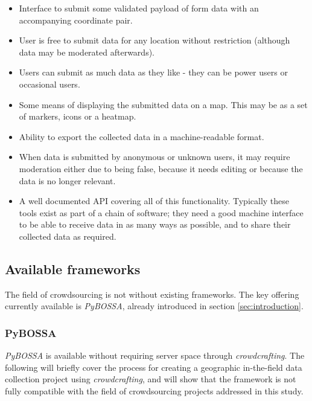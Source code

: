 \documentclass{article}
\begin{document}
		\begin{itemize}
			\item Interface to submit some validated payload of form data with an accompanying coordinate pair.
			\item User is free to submit data for any location without restriction (although data may be moderated afterwards).
			\item Users can submit as much data as they like - they can be power users or occasional users.
			\item Some means of displaying the submitted data on a map. This may be as a set of markers, icons or a heatmap.
			\item Ability to export the collected data in a machine-readable format.
			\item When data is submitted by anonymous or unknown users, it may require moderation either due to being false, because it needs editing or because the data is no longer relevant.
			\item A well documented API covering all of this functionality. Typically these tools exist as part of a chain of software; they need a good machine interface to be able to receive data in as many ways as possible, and to share their collected data as required.
		\end{itemize}

		\subsection{Available frameworks}

		The field of crowdsourcing is not without existing frameworks. The key offering currently available is \emph{PyBOSSA}, already introduced in section \ref{sec:introduction}.

		\subsubsection{PyBOSSA}

		\emph{PyBOSSA} is available without requiring server space through \emph{crowdcrafting}. The following will briefly cover the process for creating a geographic in-the-field data collection project using \emph{crowdcrafting}, and will show that the framework is not fully compatible with the field of crowdsourcing projects addressed in this study.
\end{document}
